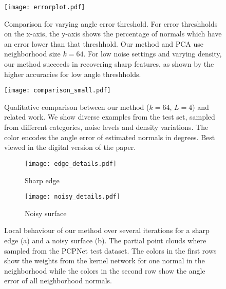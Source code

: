 \documentclass[10pt,twocolumn,letterpaper]{article}
\begin{document}
 \begin{figure}[t]
\centering
  \texttt{[image: errorplot.pdf]}
  \caption{Comparison for varying angle error threshold. For error threshholds on the x-axis, the y-axis shows the percentage of normals which have an error lower than that threshhold. Our method and PCA use neighborhood size $k=64$. For low noise settings and varying density, our method succeeds in recovering sharp features, as shown by the higher accuracies for low angle threshholds.}
  \label{fig:errorplot}
\end{figure}

 \begin{figure*}[t]
\centering
  \texttt{[image: comparison\_small.pdf]}
  \caption{Qualitative comparison between our method ($k=64$, $L=4$) and related work. We show diverse examples from the test set, sampled from different categories, noise levels and density variations. The color encodes the angle error of estimated normals in degrees. Best viewed in the digital version of the paper.}
  \label{fig:qual_comparison}

\end{figure*}

\begin{figure*}[t]
\begin{subfigure}[t]{0.5\textwidth}
    \texttt{[image: edge\_details.pdf]}
    \caption{Sharp edge}\label{fig:edge_details}
  \end{subfigure}
  \hfill
  \begin{subfigure}[t]{0.5\textwidth}
    \texttt{[image: noisy\_details.pdf]}
    \caption{Noisy surface}\label{fig:noisy_details}
  \end{subfigure}
  \caption{Local behaviour of our method over several iterations for a sharp edge (a) and a noisy surface (b). The partial point clouds where sampled from the PCPNet test dataset. The colors in the first rows show the weights from the kernel network for one normal in the neighborhood while the colors in the second row show the angle error of all neighborhood normals.}\label{fig:local_views}

\end{figure*}
\end{document}
